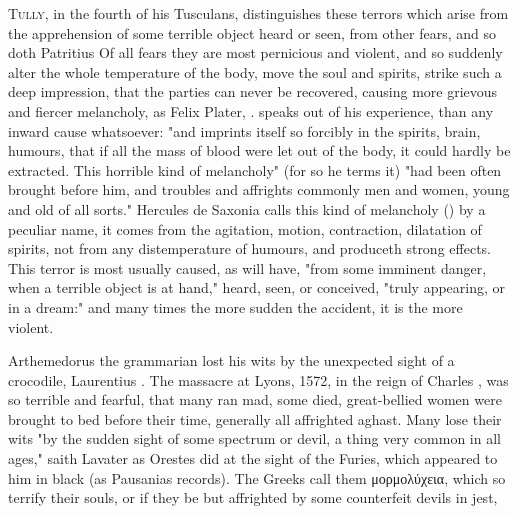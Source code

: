 \lettrine{T}{ully}, in the fourth of his Tusculans, distinguishes these terrors
which arise from the apprehension of some terrible object heard or seen, from
other fears, and so doth Patritius  Of all fears they are most pernicious and violent, and so
suddenly alter the whole temperature of the body, move the soul and spirits,
strike such a deep impression, that the parties can never be recovered, causing
more grievous and fiercer melancholy, as Felix Plater, . speaks out of his experience, than
any inward cause whatsoever: "and imprints itself so forcibly in the spirits,
brain, humours, that if all the mass of blood were let out of the body, it
could hardly be extracted. This horrible kind of melancholy" (for so he terms
it) "had been often brought before him, and troubles and affrights commonly men
and women, young and old of all sorts." Hercules de
Saxonia calls this kind of melancholy () by a
peculiar name, it comes from the agitation, motion, contraction, dilatation of
spirits, not from any distemperature of humours, and produceth strong effects.
This terror is most usually caused, as \Plutarch{} will have,
"from some imminent danger, when a terrible object is at hand," heard, seen, or
conceived, "truly appearing, or in a
dream:" and many times the more sudden the accident, it is
the more violent.


Arthemedorus the grammarian lost his wits by the unexpected sight of a
crocodile, Laurentius .
The massacre at Lyons, 1572, in the reign of Charles ,
was so terrible and fearful, that many ran mad, some died, great-bellied women
were brought to bed before their time, generally all affrighted aghast. Many
lose their wits "by the sudden sight of some spectrum or
devil, a thing very common in all ages," saith Lavater
 as Orestes did at the sight of the
Furies, which appeared to him in black (as Pausanias
records). The Greeks call them \textgreek{μορμολύχεια}, which so terrify their
souls, or if they be but affrighted by some counterfeit devils in jest,

